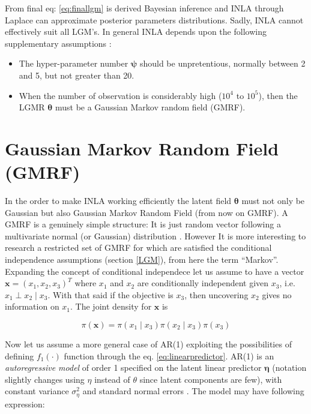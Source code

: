 \documentclass[
  12pt,
  a4paper,
  oneside]{book}
\providecommand{\tightlist}{%
  \setlength{\itemsep}{0pt}\setlength{\parskip}{0pt}}
\theoremstyle{definition}
\theoremstyle{definition}
\theoremstyle{definition}
\theoremstyle{remark}
\begin{document}
From final eq: \eqref{eq:finallgm} is derived Bayesian inference and INLA through Laplace can approximate posterior parameters distributions. Sadly, INLA cannot effectively suit all LGM's. In general INLA depends upon the following supplementary assumptions \citeyearpar{wang2018bayesian}:

\begin{itemize}
\tightlist
\item
  The hyper-parameter number \(\boldsymbol\psi\) should be unpretentious, normally between 2 and 5, but not greater than 20.
\item
  When the number of observation is considerably high (\(10^4\) to \(10^5\)), then the LGMR \(\boldsymbol\theta\) must be a Gaussian Markov random field (GMRF).
\end{itemize}

\hypertarget{gmrf}{%
\section{Gaussian Markov Random Field (GMRF)}\label{gmrf}}

In the order to make INLA working efficiently the latent field \(\boldsymbol\theta\) must not only be Gaussian but also Gaussian Markov Random Field (from now on GMRF). A GMRF is a genuinely simple structure: It is just random vector following a multivariate normal (or Gaussian) distribution \citep{GMRFRue}. However It is more interesting to research a restricted set of GMRF for which are satisfied the conditional independence assumptions (section \ref{LGM}), from here the term ``Markov''. Expanding the concept of conditional independece let us assume to have a vector \(\boldsymbol{\mathbf{x}}=\left(x_{1}, x_{2}, x_{3}\right)^{T}\) where \(x_1\) and \(x_2\) are conditionally independent given \(x_3\), i.e.~\(x_{1} \perp x_{2} \mid x_3\). With that said if the objective is \(x_3\), then uncovering \(x_2\) gives no information on \(x_1\). The joint density for \(\boldsymbol{\mathbf{x}}\) is

\begin{equation}
  \pi(\boldsymbol{\mathbf{x}})=\pi\left(x_{1} \mid x_{3}\right) \pi\left(x_{2} \mid x_{3}\right) \pi\left(x_{3}\right)
\label{eq:pix}
\end{equation}

Now let us assume a more general case of AR(1) exploiting the possibilities of defining \(f_{1}(\cdot)\) function through the eq. \eqref{eq:linearpredictor}. AR(1) is an \emph{autoregressive model} of order 1 specified on the latent linear predictor \(\boldsymbol\eta\) (notation slightly changes using \(\eta\) instead of \(\theta\) since latent components are few), with constant variance \(\sigma_{\eta}^{2}\) and standard normal errors \citetext{\citeyear{GMRFRue}; \citeyear{wang2018bayesian}}. The model may have following expression:
\end{document}
